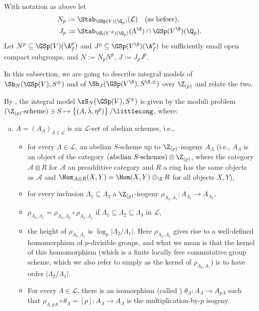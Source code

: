\documentclass[a4paper]{scrartcl} %
\numberwithin{equation}{section}
\begin{document}
With notation as above let
\begin{align*}
  N_p &:= \Stab_{\GSp(V)(\Q_p)}(\mathcal{L}) \quad\text{(as before)}, \\
  J_p&:= \Stab_{\GL(V^\S)(\Q_p)}(\Lambda^\S)\cap\GSp(V^\S)(\Q_p).
\end{align*}
Let $N^p\subseteq\GSp(V)(\A_f^p)$ and $J^p\subseteq\GSp(V^\S)(\A_f^p)$ be sufficiently small open compact subgroups, and $N:=N_pN^p$, $J:=J_pJ^p$.

In this subsection, we are going to describe integral models of $\Sh_{N}(\GSp(V),S^\pm)$ and of $\Sh_{J}(\GSp(V^\S),S^{\S,\pm})$ over $\Z_{(p)}$ and relate the two.

\begin{Remark}\label{rz-moduli}
  By \cite[Definition~6.9]{rz}, the integral model $\sS_{N}(\GSp(V),S^\pm)$ is given by the moduli problem $(\Z_{(p)}\text{-scheme})\ni S\mapsto \left\{(A,\bar\lambda,\eta^p)\right\}/\littlecong$, where:
  \begin{enumerate}[(a)]
  \item $A=\left(A_\Lambda\right)_{\Lambda\in\mathcal{L}}$ is an $\mathcal{L}$-set of abelian schemes, i.e.,
    \begin{itemize}
    \item for every $\Lambda\in\mathcal{L}$, an abelian $S$-scheme up to $\Z_{(p)}$-isogeny $A_\Lambda$ (i.e., $A_\Lambda$ is an object of the category $(\text{abelian } S\text{-schemes})\otimes\Z_{(p)}$, where the category $\mathcal{A}\otimes R$ for $\mathcal{A}$ an preadditive category and $R$ a ring has the same objects as $\mathcal{A}$ and $\Hom_{\mathcal{A}\otimes R}(X,Y)=\Hom(X,Y)\otimes_\Z R$ for all objects $X,Y$),
    \item for every inclusion $\Lambda_1\subseteq \Lambda_2$ a $\Z_{(p)}$-isogeny $\rho_{\Lambda_2,\Lambda_1}\colon  A_{\Lambda_1}\to A_{\Lambda_2}$,
    \item $\rho_{\Lambda_3,\Lambda_1}=\rho_{\Lambda_3,\Lambda_2}\circ\rho_{\Lambda_2,\Lambda_1}$ if $\Lambda_1\subseteq \Lambda_2 \subseteq \Lambda_3$ in $\mathcal{L}$,
    \item the height of $\rho_{\Lambda_2,\Lambda_1}$ is $\log_p|\Lambda_2/\Lambda_1|$. Here $\rho_{\Lambda_2,\Lambda_1}$ gives rise to a well-defined homomorphism of $p$-divisible groups, and what we mean is that the kernel of this homomorphism (which is a finite locally free commutative group scheme, which we also refer to simply as the kernel of $\rho_{\Lambda_2,\Lambda_1}$) is to have order $|\Lambda_2/\Lambda_1|$.
    \item For every $\Lambda\in \mathcal{L}$, there is an isomorphism (called ) $\theta_\Lambda\colon A_\Lambda\to A_{p\Lambda}$ such that $\rho_{\Lambda,p\Lambda}\circ \theta_\Lambda = [p]\colon A_\Lambda\to A_\Lambda$ is the multiplication-by-$p$ isogeny.

\end{itemize}
\end{enumerate}
\end{Remark}
\end{document}
